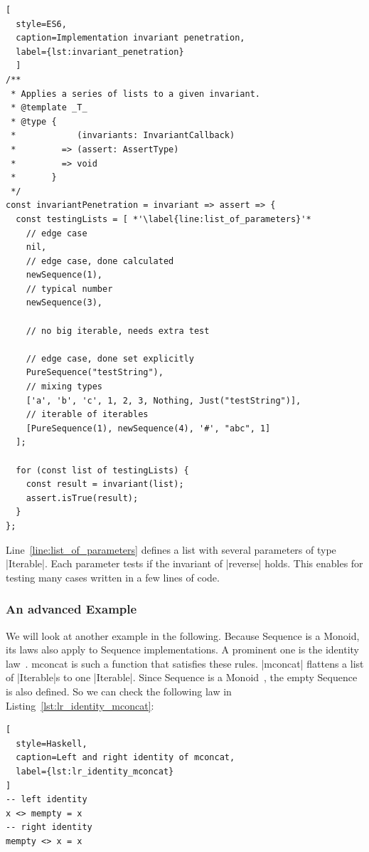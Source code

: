 \begin{lstlisting}[
  style=ES6, 
  caption=Implementation invariant penetration,
  label={lst:invariant_penetration}
  ]
/**
 * Applies a series of lists to a given invariant.
 * @template _T_
 * @type {
 *            (invariants: InvariantCallback)
 *         => (assert: AssertType)
 *         => void
 *       }
 */
const invariantPenetration = invariant => assert => {
  const testingLists = [ *'\label{line:list_of_parameters}'*
    // edge case
    nil,                                                   
    // edge case, done calculated
    newSequence(1),                                        
    // typical number
    newSequence(3),                                        

    // no big iterable, needs extra test

    // edge case, done set explicitly
    PureSequence("testString"),                            
    // mixing types
    ['a', 'b', 'c', 1, 2, 3, Nothing, Just("testString")], 
    // iterable of iterables
    [PureSequence(1), newSequence(4), '#', "abc", 1]       
  ];

  for (const list of testingLists) {
    const result = invariant(list);
    assert.isTrue(result);
  }
};
\end{lstlisting}

Line~\ref{line:list_of_parameters} defines a list with several parameters of
type |Iterable|. Each parameter tests if the invariant of |reverse| holds. 
This enables for testing many cases written in a few lines of code.

\subsubsection{An advanced Example}
\label{subsub:An advanced Example}
We will look at another example in the following. Because Sequence is a Monoid,
its laws also apply to Sequence implementations. A
prominent one is the identity law~\cite{quickcheck_hughes}. mconcat is such a function
that satisfies these rules. |mconcat| flattens a list of |Iterable|s to one
|Iterable|. Since Sequence is a Monoid~\cite{haskell_monoid}, the empty Sequence is also defined. So
we can check the following law in Listing~\ref{lst:lr_identity_mconcat}:

\begin{lstlisting}[
  style=Haskell,
  caption=Left and right identity of mconcat,
  label={lst:lr_identity_mconcat}
]
-- left identity
x <> mempty = x
-- right identity
mempty <> x = x
\end{lstlisting}

